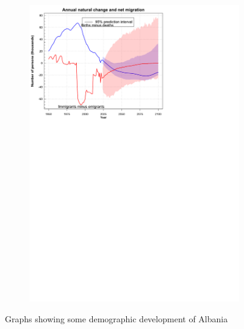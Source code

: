 \begin{figure}[H]
\begin{subfigure}[b]{0.32\textwidth}
        \includegraphics[width=\textwidth]{photos/10-Annual natural change and net migration.html.pdf}
    \end{subfigure}
    \caption{Graphs showing some demographic development of Albania \citep{unitednationsWorldPopulationProspects2024}}
    \label{fig:back-albaniaDemo}
\end{figure}
